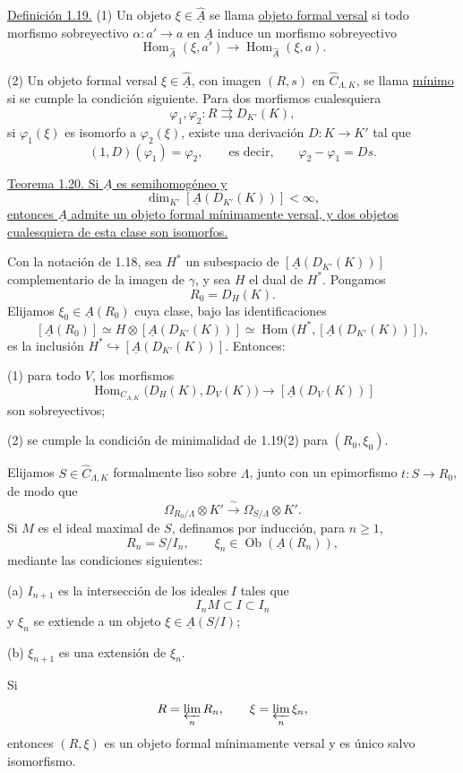 
\underline{Definición 1.19.} (1) Un objeto
$\xi\in\widehat{\underline A}$ se llama \underline{objeto formal
versal} si todo morfismo sobreyectivo $\alpha:a'\longrightarrow a$ en
$\underline A$ induce un morfismo sobreyectivo
\[
 \operatorname{Hom}_{\widehat{\underline A}}(\xi,a')
 \longrightarrow
 \operatorname{Hom}_{\widehat{\underline A}}(\xi,a).
\]

(2) Un objeto formal versal $\xi\in\widehat{\underline A}$, con
imagen $(R,s)$ en $\widehat C_{\Lambda,K}$, se llama
\underline{mínimo} si se cumple la condición siguiente. Para dos
morfismos cualesquiera
\[
 \varphi_1,\varphi_2:R\rightrightarrows D_{K'}(K),
\]
si $\varphi_1(\xi)$ es isomorfo a $\varphi_2(\xi)$, existe una
derivación $D:K\longrightarrow K'$ tal que
\[
 (1,D)(\varphi_1)=\varphi_2,
 \qquad\text{es decir,}\qquad
 \varphi_2-\varphi_1=Ds.
\]

\underline{Teorema 1.20. Si $\underline A$ es semihomogéneo y}
\[
 \dim_{K'}[\underline A(D_{K'}(K))]<\infty,
\]
\underline{entonces $\underline A$ admite un objeto formal mínimamente
versal, y dos objetos cualesquiera de esta clase son isomorfos.}


Con la notación de 1.18, sea $H^*$ un subespacio de
$[\underline A(D_{K'}(K))]$ complementario de la imagen de $\gamma$,
y sea $H$ el dual de $H^*$. Pongamos
\[
 R_0=D_H(K).
\]
Elijamos $\xi_0\in\underline A(R_0)$ cuya clase, bajo las
identificaciones
\[
 [\underline A(R_0)]
 \simeq H\otimes[\underline A(D_{K'}(K))]
 \simeq
 \operatorname{Hom}\bigl(H^*,[\underline A(D_{K'}(K))]\bigr),
\]
es la inclusión
$H^*\hookrightarrow[\underline A(D_{K'}(K))]$. Entonces:

(1) para todo $V$, los morfismos
\[
 \operatorname{Hom}_{C_{\Lambda,K}}
   \bigl(D_H(K),D_V(K)\bigr)
 \longrightarrow[\underline A(D_V(K))]
\]
son sobreyectivos;

(2) se cumple la condición de minimalidad de 1.19(2) para
$(R_0,\xi_0)$.

Elijamos $S\in\widehat C_{\Lambda,K}$ formalmente liso sobre
$\Lambda$, junto con un epimorfismo $t:S\longrightarrow R_0$, de
modo que
\[
 \Omega_{R_0/\Lambda}\otimes K'
 \xrightarrow{\ \sim\ }
 \Omega_{S/\Lambda}\otimes K'.
\]
Si $M$ es el ideal maximal de $S$, definamos por inducción, para
$n\geq1$,
\[
 R_n=S/I_n,
 \qquad
 \xi_n\in\operatorname{Ob}(\underline A(R_n)),
\]
mediante las condiciones siguientes:

(a) $I_{n+1}$ es la intersección de los ideales $I$ tales que
\[
 I_nM\subset I\subset I_n
\]
y $\xi_n$ se extiende a un objeto $\xi\in\underline A(S/I)$;

(b) $\xi_{n+1}$ es una extensión de $\xi_n$.

Si
\[
 R=\varprojlim_nR_n,
 \qquad
 \xi=\varprojlim_n\xi_n,
\]
entonces $(R,\xi)$ es un objeto formal mínimamente versal y es único
salvo isomorfismo.

